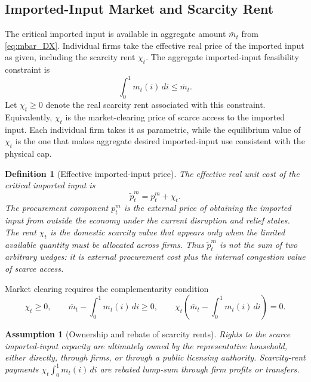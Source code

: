 ﻿\documentclass[12pt]{article}
\newtheorem{assumption}{Assumption}
\newtheorem{definition}{Definition}
\theoremstyle{remark}
\newcommand{\dd}{\,d}
\begin{document}
\subsection{Imported-Input Market and Scarcity Rent}

The critical imported input is available in aggregate amount $\bar m_t$ from
\eqref{eq:mbar_DX}. Individual firms take the effective real price of the imported input as given,
including the scarcity rent $\chi_t$. The aggregate imported-input feasibility constraint is
\begin{equation}
    \int_0^1 m_t(i)\dd i\le \bar m_t.
    \label{eq:m_cap}
\end{equation}
Let $\chi_t\ge 0$ denote the real scarcity rent associated with this constraint.
Equivalently, $\chi_t$ is the market-clearing price of scarce access to the imported input. Each
individual firm takes it as parametric, while the equilibrium value of $\chi_t$ is the one that
makes aggregate desired imported-input use consistent with the physical cap.

\begin{definition}[Effective imported-input price]\label{def:effective_m_price}
The effective real unit cost of the critical imported input is
\begin{equation}
    \tilde p_t^m=p_t^m+\chi_t.
    \label{eq:effective_m_price}
\end{equation}
The procurement component $p_t^m$ is the external price of obtaining the imported input from
outside the economy under the current disruption and relief states. The rent $\chi_t$ is the
domestic scarcity value that appears only when the limited available quantity must be allocated
across firms. Thus $\tilde p_t^m$ is not the sum of two arbitrary wedges: it is external
procurement cost plus the internal congestion value of scarce access.
\end{definition}

Market clearing requires the complementarity condition
\begin{equation}
    \chi_t\ge 0,\qquad
    \bar m_t-\int_0^1m_t(i)\dd i\ge 0,\qquad
    \chi_t\left(\bar m_t-\int_0^1m_t(i)\dd i\right)=0.
    \label{eq:m_complementarity}
\end{equation}

\begin{assumption}[Ownership and rebate of scarcity rents]\label{ass:rent_rebate}
Rights to the scarce imported-input capacity are ultimately owned by the representative household,
either directly, through firms, or through a public licensing authority. Scarcity-rent payments
$\chi_t\int_0^1m_t(i)\dd i$ are rebated lump-sum through firm profits or transfers.
\end{assumption}
\end{document}
